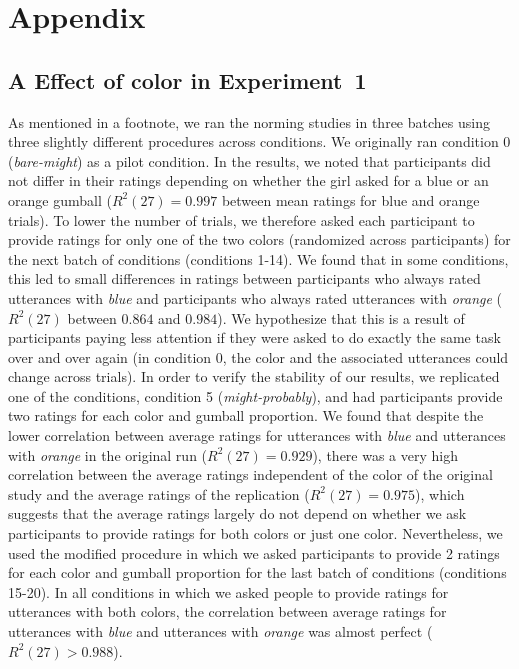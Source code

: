 \documentclass[man, floatsintext]{apa6}
\begin{document}
\pagebreak


\section*{Appendix}

\subsection*{A Effect of color in Experiment~1}

As mentioned in a footnote, we ran the norming studies in three batches using three slightly different procedures across conditions. We originally ran condition 0 (\emph{bare-might}) as a pilot condition. In the results, we noted that participants did not differ in their ratings depending on whether the girl asked for a blue or an orange gumball ($R^2(27)=0.997$ between mean ratings for blue and orange trials). To lower the number of trials, we therefore asked each participant to provide ratings for only one of the two colors (randomized across participants) for the next batch of conditions (conditions 1-14). We found that in some conditions, this led to small differences in ratings between participants who always rated utterances with \emph{blue} and participants who always rated utterances with \textit{orange} ($R^2(27)$ between $0.864$ and $0.984$). We hypothesize that this is a result of participants paying less attention if they were asked to do exactly the same task over and over again (in condition 0, the color and the associated utterances could change across trials). In order to verify the stability of our results, we replicated one of the conditions, condition 5 (\emph{might-probably}), and had participants provide two ratings for each color and gumball proportion. We found that despite the lower correlation between average ratings for utterances with \emph{blue} and utterances with \emph{orange} in the original run ($R^2(27)=0.929$), there was a very high correlation between the average ratings independent of the color of the original study and the average ratings of the replication ($R^2(27)=0.975$), which suggests that the average ratings largely do not depend on whether we ask participants to provide ratings for both colors or just one color. Nevertheless, we used the modified procedure in which we asked participants to provide 2 ratings for each color and gumball proportion for the last batch of conditions (conditions 15-20). In all conditions in which we asked people to provide ratings for utterances with both colors, the correlation between average ratings for utterances with \emph{blue} and utterances with \emph{orange} was almost perfect ($R^2(27)>0.988$).
\end{document}
